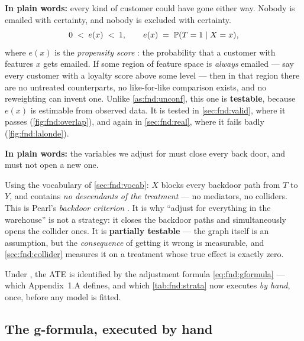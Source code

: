 \begin{assumption}\label{as:fnd:overlap}
\textbf{In plain words:} every kind of customer could have gone either way. Nobody is emailed
with certainty, and nobody is excluded with certainty.
%
\begin{equation}
  0 \;<\; e(x) \;<\; 1, \qquad e(x) \;=\; \operatorname{\mathbb{P}}(T = 1 \mid X = x),
  \label{eq:fnd:overlap}
\end{equation}
%
where $e(x)$ is the \emph{propensity score} \citep{rosenbaum1983}: the probability that a
customer with features $x$ gets emailed. If some region of feature space is \emph{always}
emailed --- say every customer with a loyalty score above some level --- then in that region
there are no untreated counterparts, no like-for-like comparison exists, and no reweighting can
invent one. Unlike \cref{as:fnd:unconf}, this one is \textbf{testable}, because $e(x)$ is
estimable from observed data. It is tested in \cref{sec:fnd:valid}, where it passes
(\cref{fig:fnd:overlap}), and again in \cref{sec:fnd:real}, where it fails badly
(\cref{fig:fnd:lalonde}).
\end{assumption}

\begin{assumption}\label{as:fnd:backdoor}
\textbf{In plain words:} the variables we adjust for must close every back door, and must not
open a new one.

Using the vocabulary of \cref{sec:fnd:vocab}: $X$ blocks every backdoor path from $T$ to $Y$,
and contains \emph{no descendants of the treatment} --- no mediators, no colliders. This is
Pearl's \emph{backdoor criterion} \citep{pearl1995, pearl2009}. It is why
``adjust for everything in the warehouse'' is not a strategy: it closes the backdoor paths and
simultaneously opens the collider ones. It is \textbf{partially testable} --- the graph itself
is an assumption, but the \emph{consequence} of getting it wrong is measurable, and
\cref{sec:fnd:collider} measures it on a treatment whose true effect is exactly zero.
\end{assumption}

Under , the ATE is identified by the adjustment formula
\cref{eq:fnd:gformula} --- which Appendix~1.A defines, and which \cref{tab:fnd:strata} now
executes \emph{by hand}, once, before any model is fitted.

\subsection*{The g-formula, executed by hand}

